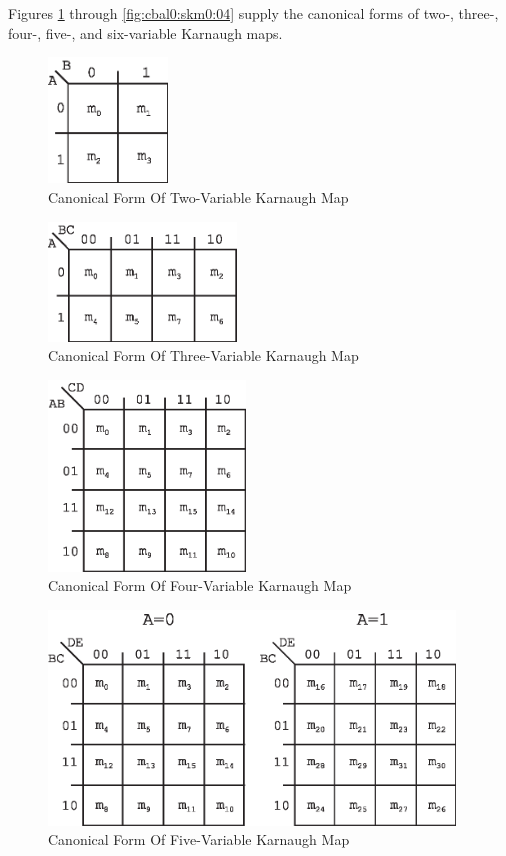 Figures \ref{fig:cbal0:skm0:00} through \ref{fig:cbal0:skm0:04}
supply the canonical forms of two-, three-, four-, five-, and
six-variable Karnaugh maps.

\begin{figure}
\centering
\includegraphics[width=1.25in]{c_bal0/kmap02cf.eps}
\caption{Canonical Form Of Two-Variable Karnaugh Map}
\label{fig:cbal0:skm0:00}
\end{figure}

\begin{figure}
\centering
\includegraphics[height=1.25in]{c_bal0/kmap03cf.eps}
\caption{Canonical Form Of Three-Variable Karnaugh Map}
\label{fig:cbal0:skm0:01}
\end{figure}

\begin{figure}
\centering
\includegraphics[height=2.0in]{c_bal0/kmap04cf.eps}
\caption{Canonical Form Of Four-Variable Karnaugh Map}
\label{fig:cbal0:skm0:02}
\end{figure}

\begin{figure}
\centering
\includegraphics[width=4.25in]{c_bal0/kmap05cf.eps}
\caption{Canonical Form Of Five-Variable Karnaugh Map}
\label{fig:cbal0:skm0:03}
\end{figure}

